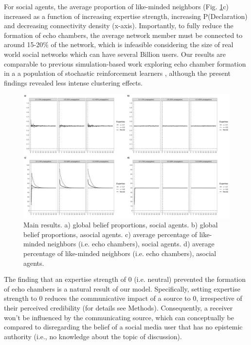 \documentclass[fleqn,10pt]{wlscirep}
\begin{document}
For social agents, the average proportion of like-minded neighbors (Fig. \ref{fig:results}c) increased as a function of increasing expertise strength, increasing P(Declaration) and decreasing connectivity density (x-axis). Importantly, to fully reduce the formation of echo chambers, the average network member must be connected to around 15-20\% of the network, which is infeasible considering the size of real world social networks which can have several Billion users. Our results are comparable to previous simulation-based work exploring echo chamber formation in a a population of stochastic reinforcement learners \cite{pilditch2017opinion}, although the present findings revealed less intense clustering effects. 

\begin{figure}[ht]
\centering
\includegraphics[width=1\columnwidth]{img/results_pdf.pdf}
\caption{Main results. a) global belief proportions, social agents. b) global belief proportions, asocial agents. c) average percentage of like-minded neighbors (i.e. echo chambers), social agents. d) average percentage of like-minded neighbors (i.e. echo chambers), asocial agents.}
\label{fig:results}
\end{figure}

The finding that an expertise strength of 0 (i.e. neutral) prevented the formation of echo chambers is a natural result of our model. Specifically, setting expertise strength to 0 reduces the communicative impact of a source to 0, irrespective of their perceived credibility (for details see Methods). Consequently, a receiver won't be influenced by the communicating source, which can conceptually be compared to disregarding the belief of a social media user that has no epistemic authority (i.e., no knowledge about the topic of discussion).
\end{document}
